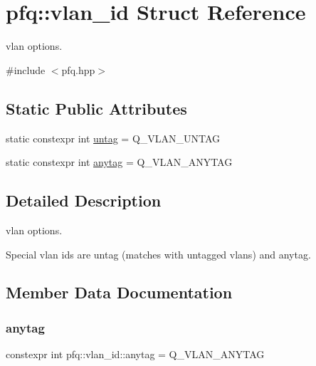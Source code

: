 \hypertarget{structpfq_1_1vlan__id}{}\section{pfq\+:\+:vlan\+\_\+id Struct Reference}
\label{structpfq_1_1vlan__id}


vlan options.  




{\ttfamily \#include $<$pfq.\+hpp$>$}

\subsection*{Static Public Attributes}
\begin{DoxyCompactItemize}
\item 
static constexpr int \hyperlink{structpfq_1_1vlan__id_a9e30bbd86d62e58ae5e5e080f7e046df}{untag} = Q\+\_\+\+V\+L\+A\+N\+\_\+\+U\+N\+T\+AG
\item 
static constexpr int \hyperlink{structpfq_1_1vlan__id_affdae3b855070274e64b5d5696d6d72e}{anytag} = Q\+\_\+\+V\+L\+A\+N\+\_\+\+A\+N\+Y\+T\+AG
\end{DoxyCompactItemize}


\subsection{Detailed Description}
vlan options. 

Special vlan ids are untag (matches with untagged vlans) and anytag. 

\subsection{Member Data Documentation}
\mbox{\label{structpfq_1_1vlan__id_affdae3b855070274e64b5d5696d6d72e}} 
\subsubsection{\texorpdfstring{anytag}{anytag}}
{\footnotesize\ttfamily constexpr int pfq\+::vlan\+\_\+id\+::anytag = Q\+\_\+\+V\+L\+A\+N\+\_\+\+A\+N\+Y\+T\+AG\hspace{0.3cm}{\ttfamily [static]}}

\mbox{\label{structpfq_1_1vlan__id_a9e30bbd86d62e58ae5e5e080f7e046df}} 
